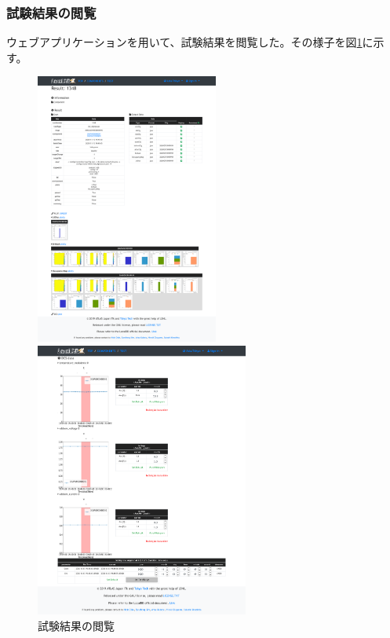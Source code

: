 \subsubsection{試験結果の閲覧}
ウェブアプリケーションを用いて、試験結果を閲覧した。その様子を図\ref{demo_view_result}に示す。
\begin{figure}[bpt]\centering
  \begin{center}
  \begin{minipage}{0.4\hsize}
    \includegraphics[width=6cm]{demo_view_scan_result}
  \end{minipage}
  \begin{minipage}{0.4\hsize}
    \includegraphics[width=7cm]{demo_view_dcs}
  \end{minipage}
  \caption[試験結果の閲覧]{試験結果の閲覧}
  \label{demo_view_result}
  \end{center}
\end{figure}


